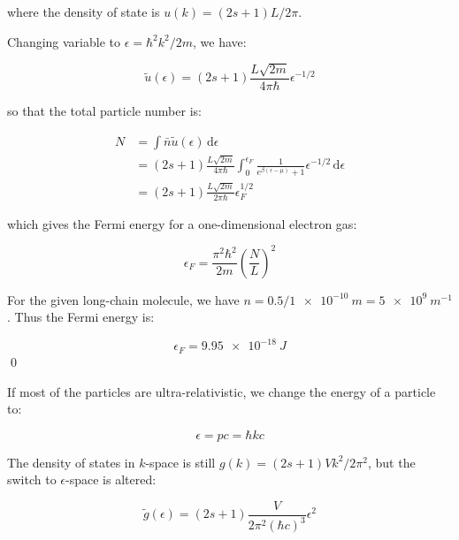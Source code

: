 \documentclass[12pt]{article}
\begin{document}
where the density of state is $u(k) = (2s + 1) L / 2\pi$.

Changing variable to $\epsilon = \hbar^{2} k^{2}/2m$, we have:

\begin{equation}
    \tilde{u}(\epsilon) = (2s + 1) \frac{L \sqrt{2m}}{4\pi \hbar} \epsilon^{-1/2}
\end{equation}

so that the total particle number is:

\begin{equation}
    \begin{split}
        N &= \int \bar{n} \tilde{u}(\epsilon) \, \mathrm{d}\epsilon \\
        &= (2s + 1) \frac{L \sqrt{2m}}{4\pi \hbar} \int_{0}^{\epsilon_{F}} \frac{1}{e^{\beta (\epsilon - \mu)} + 1} \epsilon^{-1/2} \, \mathrm{d}\epsilon \\
        &= (2s + 1) \frac{L \sqrt{2m}}{2\pi \hbar} \epsilon_{F}^{1/2}
    \end{split}
\end{equation}

which gives the Fermi energy for a one-dimensional electron gas:

\begin{equation}
    \epsilon_{F} = \frac{\pi^{2} \hbar^{2} }{2m} \left( \frac{N}{L} \right)^{2}
\end{equation}

For the given long-chain molecule, we have $n = 0.5/\qty{1e-10}{m} = \qty{5e9}{m^{-1}}$. Thus the Fermi energy is:

\begin{equation}
    \epsilon_{F} = \qty{9.95e-18}{J}
\end{equation}
\qed



If most of the particles are ultra-relativistic, we change the energy of a particle to:

\begin{equation}
    \epsilon = pc = \hbar k c
\end{equation}

The density of states in $k$-space is still $g(k) = (2s + 1) V k^{2} / 2\pi^{2}$, but the switch to $\epsilon$-space is altered:

\begin{equation}
    \tilde{g}(\epsilon) = (2s + 1) \frac{V}{2\pi^{2}(\hbar c)^{3}} \epsilon^{2}
\end{equation}
\end{document}
